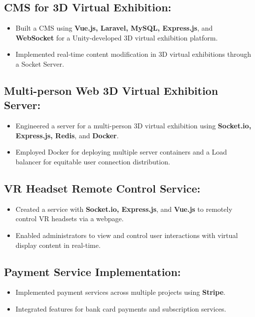 \documentclass{resume}
\begin{document}
{\small\subsection*{CMS for 3D Virtual Exhibition:}}
\begin{itemize}[noitemsep]
    \item Built a CMS using \textbf{Vue.js, Laravel, MySQL, Express.js}, and \textbf{WebSocket} for a Unity-developed 3D virtual exhibition platform.
    \item Implemented real-time content modification in 3D virtual exhibitions through a Socket Server.
\end{itemize}
{\small\subsection*{Multi-person Web 3D Virtual Exhibition Server:}}
\begin{itemize}[noitemsep]
    \item Engineered a server for a multi-person 3D virtual exhibition using \textbf{Socket.io, Express.js, Redis}, and \textbf{Docker}.
    \item Employed Docker for deploying multiple server containers and a Load balancer for equitable user connection distribution.
\end{itemize}
{\small\subsection*{VR Headset Remote Control Service:}}
\begin{itemize}[noitemsep]
    \item Created a service with \textbf{Socket.io, Express.js}, and \textbf{Vue.js} to remotely control VR headsets via a webpage.
    \item Enabled administrators to view and control user interactions with virtual display content in real-time.
\end{itemize}
{\small\subsection*{Payment Service Implementation:}}
\begin{itemize}[noitemsep]
    \item Implemented payment services across multiple projects using \textbf{Stripe}.
    \item Integrated features for bank card payments and subscription services.
\end{itemize}
\end{document}
